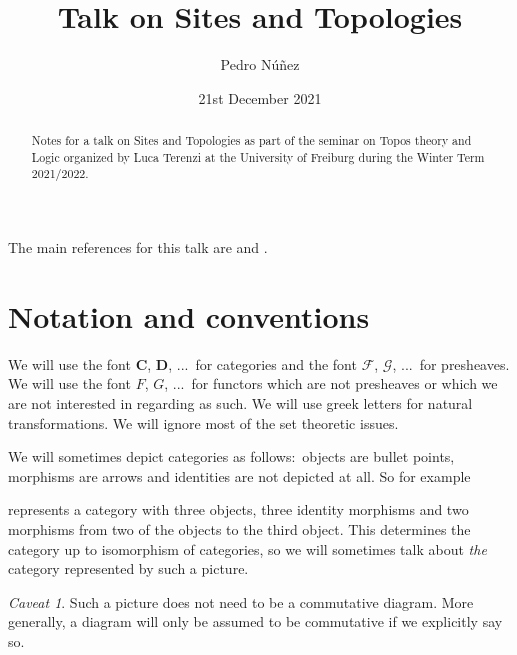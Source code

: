 \documentclass[12pt,reqno,a4paper]{amsart}
\title[Talk on Sites and Topologies]{Talk on Sites and Topologies}
\author[Pedro N\'{u}\~{n}ez]{Pedro N\'{u}\~{n}ez}
\date{21st December 2021}
\theoremstyle{plain}
\theoremstyle{definition}
\theoremstyle{remark}
\newtheorem{cav}{Caveat}
\begin{document}
\maketitle

\begin{abstract}
  Notes for a talk on Sites and Topologies as part of the seminar on Topos theory and Logic organized by Luca Terenzi at the University of Freiburg during the Winter Term 2021/2022.
\end{abstract}

\tableofcontents


The main references for this talk are \cite{sga4} and \cite{stacks-project}.

\setcounter{section}{-1}

\section{Notation and conventions}

We will use the font $\mathbf{C}$, $\mathbf{D}$, ...~for categories and the font $\mathscr{F}$, $\mathscr{G}$, ...~for presheaves.
We will use the font $F$, $G$, ...~for functors which are not presheaves or which we are not interested in regarding as such.
We will use greek letters for natural transformations.
We will ignore most of the set theoretic issues.

We will sometimes depict categories as follows:~objects are bullet points, morphisms are arrows and identities are not depicted at all.
So for example
\begin{center}
\end{center}
represents a category with three objects, three identity morphisms and two morphisms from two of the objects to the third object.
This determines the category up to isomorphism of categories, so we will sometimes talk about \textit{the} category represented by such a picture.

\begin{cav}
  Such a picture does not need to be a commutative diagram.
  More generally, a diagram will only be assumed to be commutative if we explicitly say so.
\end{cav}
\end{document}
